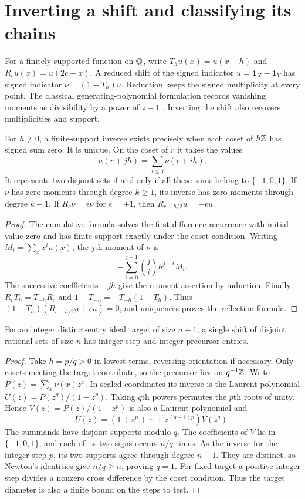 \section{Inverting a shift and classifying its chains}\label{sec:shift}
For a finitely supported function on \(\mathbb Q\), write \(T_hu(x)=u(x-h)\) and \(R_cu(x)=u(2c-x)\). A reduced shift of the signed indicator \(u=\mathbf1_X-\mathbf1_Y\) has signed indicator \(\nu=(1-T_h)u\). Reduction keeps the signed multiplicity at every point. The classical generating-polynomial formulation records vanishing moments as divisibility by a power of \(z-1\) \cite[Lemma~1]{blp}. Inverting the shift also recovers multiplicities and support.

\begin{proposition}\label{prop:inverse}
For \(h\ne0\), a finite-support inverse exists precisely when each coset of \(h\mathbb Z\) has signed sum zero. It is unique. On the coset of \(r\) it takes the values
\[
u(r+jh)=\sum_{i\le j}\nu(r+ih).
\]
It represents two disjoint sets if and only if all these sums belong to \(\{-1,0,1\}\). If \(\nu\) has zero moments through degree \(k\ge1\), its inverse has zero moments through degree \(k-1\). If \(R_c\nu=\epsilon\nu\) for \(\epsilon=\pm1\), then \(R_{c-h/2}u=-\epsilon u\).
\end{proposition}
\begin{proof}
The cumulative formula solves the first-difference recurrence with initial value zero and has finite support exactly under the coset condition. Writing \(M_i=\sum_x x^iu(x)\), the \(j\)th moment of \(\nu\) is
\[
-\sum_{i=0}^{j-1}\binom ji h^{j-i}M_i .
\]
The successive coefficients \(-jh\) give the moment assertion by induction. Finally \(R_cT_h=T_{-h}R_c\) and \(1-T_{-h}=-T_{-h}(1-T_h)\). Thus \((1-T_h)(R_{c-h/2}u+\epsilon u)=0\), and uniqueness proves the reflection formula.
\end{proof}

\begin{corollary}
For an integer distinct-entry ideal target of size \(n+1\), a single shift of disjoint rational sets of size \(n\) has integer step and integer precursor entries.
\end{corollary}
\begin{proof}
Take \(h=p/q>0\) in lowest terms, reversing orientation if necessary. Only cosets meeting the target contribute, so the precursor lies on \(q^{-1}\mathbb Z\). Write \(P(z)=\sum_x\nu(x)z^x\). In scaled coordinates its inverse is the Laurent polynomial \(U(z)=P(z^q)/(1-z^p)\). Taking \(q\)th powers permutes the \(p\)th roots of unity. Hence \(V(z)=P(z)/(1-z^p)\) is also a Laurent polynomial and
\[
 U(z)=(1+z^p+\cdots+z^{(q-1)p})V(z^q).
\]
The summands have disjoint supports modulo \(q\). The coefficients of \(V\) lie in \(\{-1,0,1\}\), and each of its two signs occurs \(n/q\) times. As the inverse for the integer step \(p\), its two supports agree through degree \(n-1\). They are distinct, so Newton's identities give \(n/q\ge n\), proving \(q=1\). For fixed target a positive integer step divides a nonzero cross difference by the coset condition. Thus the target diameter is also a finite bound on the steps to test.
\end{proof}

